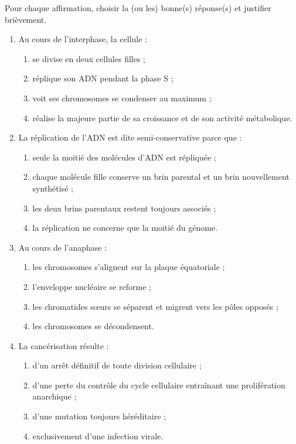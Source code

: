 \documentclass[11pt]{article}
\begin{document}
\begin{exercice}
Pour chaque affirmation, choisir la (ou les) bonne(s) réponse(s) et justifier brièvement.
\begin{enumerate}
\item Au cours de l'interphase, la cellule :
\begin{enumerate}
\item[a)] se divise en deux cellules filles ;
\item[b)] réplique son ADN pendant la phase S ;
\item[c)] voit ses chromosomes se condenser au maximum ;
\item[d)] réalise la majeure partie de sa croissance et de son activité métabolique.
\end{enumerate}
\item La réplication de l'ADN est dite semi-conservative parce que :
\begin{enumerate}
\item[a)] seule la moitié des molécules d'ADN est répliquée ;
\item[b)] chaque molécule fille conserve un brin parental et un brin nouvellement synthétisé ;
\item[c)] les deux brins parentaux restent toujours associés ;
\item[d)] la réplication ne concerne que la moitié du génome.
\end{enumerate}
\item Au cours de l'anaphase :
\begin{enumerate}
\item[a)] les chromosomes s'alignent sur la plaque équatoriale ;
\item[b)] l'enveloppe nucléaire se reforme ;
\item[c)] les chromatides sœurs se séparent et migrent vers les pôles opposés ;
\item[d)] les chromosomes se décondensent.
\end{enumerate}
\item La cancérisation résulte :
\begin{enumerate}
\item[a)] d'un arrêt définitif de toute division cellulaire ;
\item[b)] d'une perte du contrôle du cycle cellulaire entraînant une prolifération anarchique ;
\item[c)] d'une mutation toujours héréditaire ;
\item[d)] exclusivement d'une infection virale.
\end{enumerate}
\end{enumerate}
\end{exercice}
\end{document}
